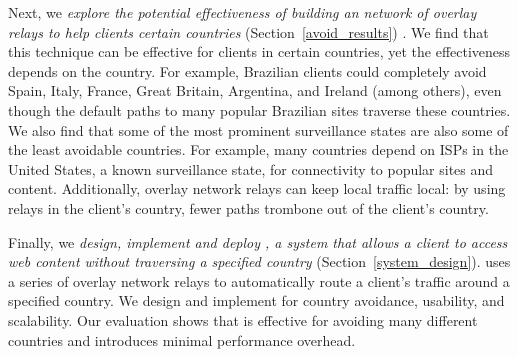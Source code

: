 Next, we {\em explore the
potential effectiveness of building an network of overlay relays to help
clients certain countries}  (Section~\ref{avoid_results}) .  We find that this technique can be effective
for clients in certain countries, yet the effectiveness depends on the
country.  For example, Brazilian clients could completely avoid Spain,
Italy, France, Great Britain, Argentina, and Ireland (among others),
even though the default paths to many popular Brazilian sites traverse
these countries. We also find that some of the most prominent
surveillance states are also some of the least avoidable countries.  For
example, many countries depend on ISPs in the United States, a known
surveillance state, for connectivity to popular sites and content.
Additionally, overlay network relays can keep local traffic local: by
using relays in the client's country, fewer paths trombone out of the
client's country.

Finally, we {\em design, implement and deploy \system{}, a system that allows
a client to access web content without traversing a specified country}
(Section~\ref{system_design}).  \system{} uses a series of overlay
network relays to automatically route a client's traffic around a
specified country.  We design and implement \system{} for country
avoidance, usability, and scalability.  Our evaluation shows that 
\system{} is effective for avoiding many different countries and
introduces minimal performance overhead.
